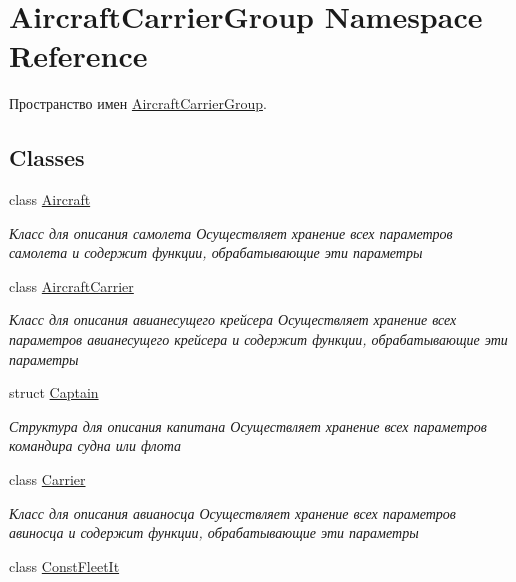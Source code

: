 \hypertarget{namespace_aircraft_carrier_group}{}\section{Aircraft\+Carrier\+Group Namespace Reference}
\label{namespace_aircraft_carrier_group}


Пространство имен \mbox{\hyperlink{namespace_aircraft_carrier_group}{Aircraft\+Carrier\+Group}}.  


\subsection*{Classes}
\begin{DoxyCompactItemize}
\item 
class \mbox{\hyperlink{class_aircraft_carrier_group_1_1_aircraft}{Aircraft}}
\begin{DoxyCompactList}\small\item\em Класс для описания самолета  Осуществляет хранение всех параметров самолета и содержит функции, обрабатывающие эти параметры \end{DoxyCompactList}\item 
class \mbox{\hyperlink{class_aircraft_carrier_group_1_1_aircraft_carrier}{Aircraft\+Carrier}}
\begin{DoxyCompactList}\small\item\em Класс для описания авианесущего крейсера  Осуществляет хранение всех параметров авианесущего крейсера и содержит функции, обрабатывающие эти параметры \end{DoxyCompactList}\item 
struct \mbox{\hyperlink{struct_aircraft_carrier_group_1_1_captain}{Captain}}
\begin{DoxyCompactList}\small\item\em Структура для описания капитана  Осуществляет хранение всех параметров командира судна или флота \end{DoxyCompactList}\item 
class \mbox{\hyperlink{class_aircraft_carrier_group_1_1_carrier}{Carrier}}
\begin{DoxyCompactList}\small\item\em Класс для описания авианосца  Осуществляет хранение всех параметров авиносца и содержит функции, обрабатывающие эти параметры \end{DoxyCompactList}\item 
class \mbox{\hyperlink{class_aircraft_carrier_group_1_1_const_fleet_it}{Const\+Fleet\+It}}

\end{DoxyCompactItemize}

